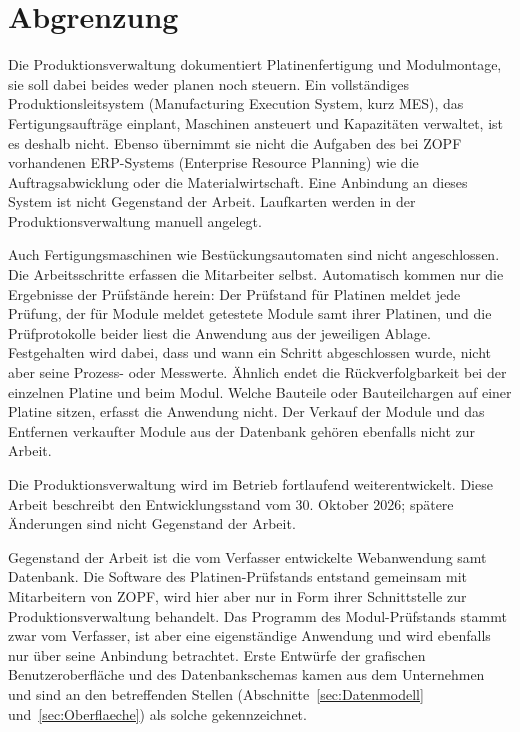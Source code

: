 \section{Abgrenzung}
\label{sec:Abgrenzung}
Die Produktionsverwaltung dokumentiert Platinenfertigung und Modulmontage,
sie soll dabei beides weder planen noch steuern. Ein vollständiges
Produktionsleitsystem (Manufacturing Execution System, kurz MES), das
Fertigungsaufträge einplant, Maschinen ansteuert und Kapazitäten verwaltet, ist
es deshalb nicht. Ebenso übernimmt sie nicht die Aufgaben des bei ZOPF
vorhandenen ERP-Systems (Enterprise Resource Planning) wie die
Auftragsabwicklung oder die Materialwirtschaft. Eine Anbindung an dieses System
ist nicht Gegenstand der Arbeit. Laufkarten werden in der Produktionsverwaltung
manuell angelegt.

Auch Fertigungsmaschinen wie Bestückungsautomaten sind nicht angeschlossen.
Die Arbeitsschritte erfassen die Mitarbeiter selbst. Automatisch kommen nur die
Ergebnisse der Prüfstände herein: Der Prüfstand für Platinen meldet jede
Prüfung, der für Module meldet getestete Module samt ihrer Platinen, und die
Prüfprotokolle beider liest die Anwendung aus der jeweiligen Ablage.
Festgehalten wird dabei, dass und wann ein Schritt abgeschlossen wurde, nicht
aber seine Prozess- oder Messwerte. Ähnlich endet die Rückverfolgbarkeit bei der
einzelnen Platine und beim Modul. Welche Bauteile oder Bauteilchargen auf einer
Platine sitzen, erfasst die Anwendung nicht. Der Verkauf der Module und das
Entfernen verkaufter Module aus der Datenbank gehören ebenfalls nicht zur
Arbeit.

Die Produktionsverwaltung wird im Betrieb fortlaufend weiterentwickelt. Diese
Arbeit beschreibt den Entwicklungsstand vom 30. Oktober 2026; spätere
Änderungen sind nicht Gegenstand der Arbeit.

Gegenstand der Arbeit ist die vom Verfasser entwickelte Webanwendung samt
Datenbank. Die Software des Platinen-Prüfstands entstand gemeinsam mit
Mitarbeitern von ZOPF, wird hier aber nur in Form ihrer Schnittstelle zur
Produktionsverwaltung behandelt. Das Programm des Modul-Prüfstands stammt
zwar vom Verfasser, ist aber eine eigenständige Anwendung und wird
ebenfalls nur über seine Anbindung betrachtet. Erste Entwürfe der
grafischen Benutzeroberfläche und des Datenbankschemas kamen aus dem Unternehmen und sind
an den betreffenden Stellen (Abschnitte~\ref{sec:Datenmodell}
und~\ref{sec:Oberflaeche}) als solche gekennzeichnet.

